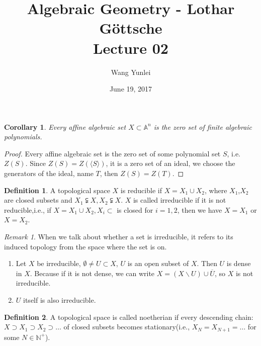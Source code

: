 \documentclass{amsart}
\theoremstyle{plain}
\newtheorem{corollary}{Corollary}
\theoremstyle{definition}
\newtheorem{definition}{Definition}
\theoremstyle{remark}
\newtheorem*{remark}{Remark}
\numberwithin{equation}{section}
\begin{document}
\title[Complete-simple distributive lattices]
{Algebraic Geometry - Lothar G\"{o}ttsche \\
	Lecture 02}
\author{Wang Yunlei}
\date{June 19, 2017}
 
\maketitle


 \begin{corollary}
 	Every affine algebraic set $ X\subset \mathbb{A}^n $ is the zero set of finite algebraic polynomials.
 \end{corollary}
 \begin{proof}
 	Every affine algebraic set is the zero set of some polynomial set $ S $, i.e. $ Z(S) $. Since $ Z(S)=Z(\langle S \rangle) $, it is a zero set of an ideal, we choose the generators of the ideal, name $ T $, then $ Z(S)=Z(T) $.
 \end{proof}
 \begin{definition}
 	A topological space $ X $ is reducible if $ X=X_1\cup X_2 $, where $ X_1 $,$ X_2 $ are closed subsets and $ X_1\subsetneqq X,X_2\subsetneqq X $. $ X $ is called irreducible if it is not reducible,i.e., if $ X=X_1\cup X_2, X_i\subset  $ is closed for $ i=1,2 $, then we have $ X=X_1 $ or $ X=X_2 $.
 \end{definition}
 \begin{remark}
 	When we talk about whether a set is irreducible, it refers to its induced topology from the space where the set is on.
 	\begin{enumerate}
 		\item Let $ X $ be irreducible, $ \emptyset\neq U\subset X $, $ U $ is an open subset of $ X $. Then $ U $ is dense in $ X $. Because if it is not dense, we can write $ X=(X\backslash U )\cup \overline{U} $, so $ X $ is not irreducible.
 		\item $ U $ itself is also irreducible.
 	\end{enumerate}
 \end{remark}
 \begin{definition}
 	A topological space is called noetherian if every descending chain:$ X\supset X_1\supset X_2\supset \dots $ of closed subsets becomes stationary(i.e., $ X_N=X_{N+1}=\dots $ for some $ N\in \mathbb{N}^+ $).
 \end{definition}
\end{document}

